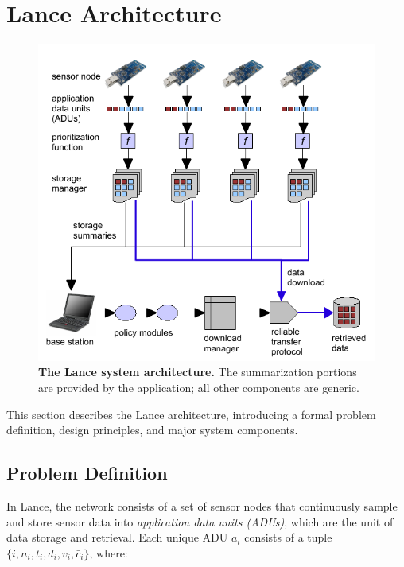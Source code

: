 \section{Lance Architecture}
\label{lance-sec-architecture}

\begin{figure}[t]
\begin{center}
\includegraphics[width=0.8\hsize]{./4-lance/figs/architecture.pdf}
\end{center}

\caption{\textbf{The Lance system architecture.} The summarization portions
are provided by the application; all other components are generic.}

\label{lance-fig-architecture}
\end{figure}

This section describes the Lance architecture, introducing a formal problem
definition, design principles, and major system components.

\subsection{Problem Definition}
\label{lance-sec-problem-definition}

In Lance, the network consists of a set of sensor nodes that continuously
sample and store sensor data into \textit{application data units (ADUs)},
which are the unit of data storage and retrieval. Each unique ADU $a_i$
consists of a tuple $\{ i, n_i, t_i, d_i, v_i, \bar{c}_i \}$, where:

